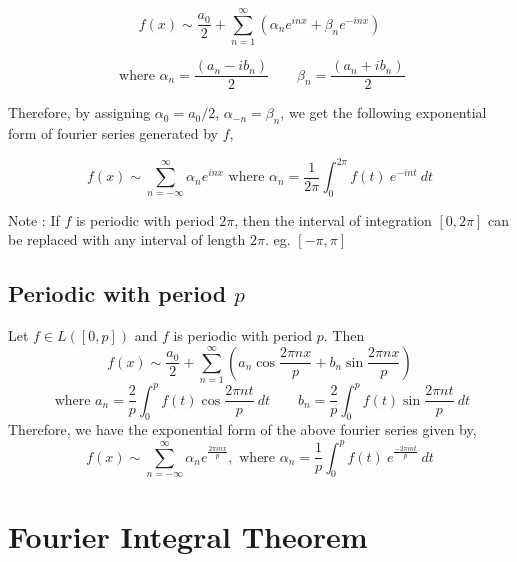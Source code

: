 	$$f(x) \sim \frac{a_0}{2} + \sum_{n=1}^\infty \left( \alpha_n e^{inx} + \beta_n e^{-inx} \right)$$

	$$\text{ where } \alpha_n = \frac{(a_n - ib_n)}{2} \qquad \beta_n = \frac{(a_n+ib_n)}{2}$$

	Therefore, by assigning $\alpha_0 = a_0/2$, $\alpha_{-n} = \beta_n$, we get the following exponential form of fourier series generated by $f$,

	$$f(x) \sim \sum_{n = -\infty}^\infty \alpha_n e^{inx} \text{ where } \alpha_n = \frac{1}{2\pi} \int_0^{2\pi} f(t)\ e^{-int}\ dt$$

	Note : If $f$ is periodic with period $2\pi$, then the interval of integration $[0,2\pi]$ can be replaced with any interval of length $2\pi$. eg. $[-\pi,\pi]$

\subsection{Periodic with period $p$}
	Let $f \in L([0,p])$ and $f$ is periodic with period $p$. Then
	$$ f(x) \sim \frac{a_0}{2} + \sum_{n=1}^\infty \left( a_n \cos \frac{2\pi nx}{p} + b_n \sin \frac{2\pi nx}{p} \right) $$
	$$ \text{ where } a_n = \frac{2}{p} \int_0^p f(t) \cos \frac{2\pi nt}{p}\ dt \qquad b_n = \frac{2}{p} \int_0^p f(t) \sin \frac{2\pi nt}{p}\ dt$$
	Therefore, we have the exponential form of the above fourier series given by,
	$$ f(x) \sim \sum_{n = -\infty}^\infty \alpha_n e^\frac{2\pi inx}{p},\text{ where } \alpha_n = \frac{1}{p} \int_0^p f(t)\ e^\frac{-2\pi int}{p}\ dt$$
	
\section{Fourier Integral Theorem}

